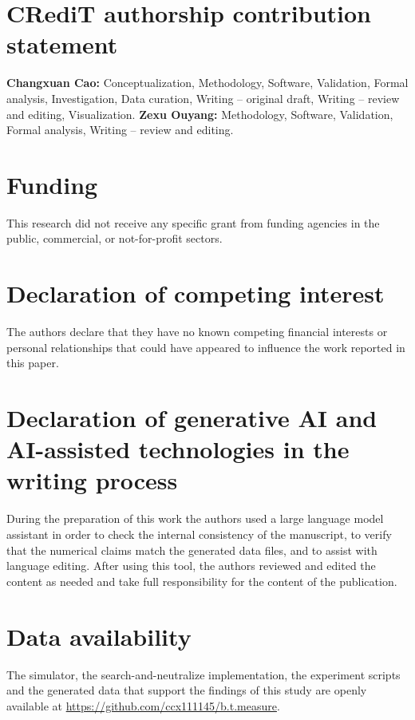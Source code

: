 \documentclass[preprint,12pt,3p]{elsarticle}
\theoremstyle{definition}
\begin{document}
\section*{CRediT authorship contribution statement}

\textbf{Changxuan Cao:} Conceptualization, Methodology, Software, Validation, Formal analysis, Investigation, Data curation, Writing -- original draft, Writing -- review and editing, Visualization. \textbf{Zexu Ouyang:} Methodology, Software, Validation, Formal analysis, Writing -- review and editing.

\section*{Funding}

This research did not receive any specific grant from funding agencies in the public, commercial, or not-for-profit sectors.

\section*{Declaration of competing interest}

The authors declare that they have no known competing financial interests or personal relationships that could have appeared to influence the work reported in this paper.

\section*{Declaration of generative AI and AI-assisted technologies in the writing process}

During the preparation of this work the authors used a large language model assistant in order
to check the internal consistency of the manuscript, to verify that the numerical claims match
the generated data files, and to assist with language editing. After using this tool, the
authors reviewed and edited the content as needed and take full responsibility for the content
of the publication.

\section*{Data availability}

The simulator, the search-and-neutralize implementation, the experiment scripts and the generated data that support the findings of this study are openly available at \url{https://github.com/ccx111145/b.t.measure}.
\end{document}
